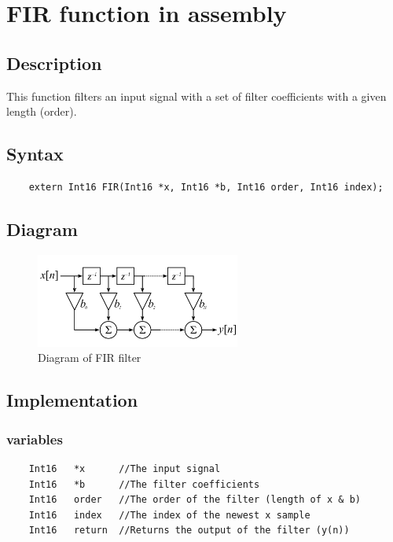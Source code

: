 
\section{FIR function in assembly}
\subsection{Description}
This function filters an input signal with a set of filter coefficients with a given length (order).


\subsection{Syntax} 
\begin{lstlisting}
	extern Int16 FIR(Int16 *x, Int16 *b, Int16 order, Int16 index);
\end{lstlisting}

\subsection{Diagram}
\begin{figure} [h]
	\centering
	\includegraphics[width=0.6\textwidth]{../Journal/Code/FIRfilter}
	\caption{Diagram of FIR filter}
	\label{Fig:FIR_filter}
\end{figure}


\subsection{Implementation}

\subsubsection{variables}
\begin{lstlisting}
	Int16 	*x 		//The input signal
	Int16	*b		//The filter coefficients
	Int16	order	//The order of the filter (length of x & b)
	Int16	index	//The index of the newest x sample
	Int16	return	//Returns the output of the filter (y(n))
\end{lstlisting}

